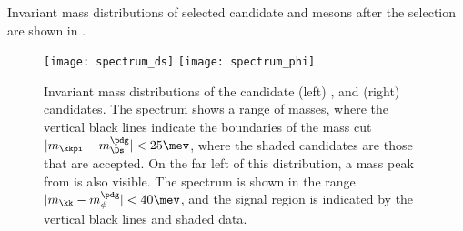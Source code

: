 


Invariant mass distributions of
selected candidate \Ds and \phii mesons after the selection are shown in .

\begin{figure}
  \begin{center}
    \texttt{[image: spectrum\_ds]}
    \texttt{[image: spectrum\_phi]}
    \caption[Selected \Ds and \phii candidates]
    {
      Invariant mass distributions of the candidate
      (left) \decay{\Ds}{\kkpi}, and
      (right) \decay{\phii}{\kk} candidates.
      The \kkpi spectrum shows a range of masses, where the vertical black lines indicate the
      boundaries of the mass cut $|m_{\kkpi}-m_{\Ds}^\pdg|<25\mev$, where the shaded candidates are
      those that are accepted.
      On the far left of this distribution, a mass peak from \decay{\Dp}{\kkpi} is also visible.
      The \decay{\phi}{\kk} spectrum is shown in the range $|m_{\kk}-m_{\phi}^\pdg|<40\mev$,
      and the signal region is indicated by the vertical black lines and shaded data.
    }
    \label{fig:dsphi:mesons}
  \end{center}
\end{figure}


